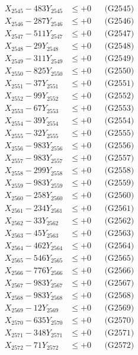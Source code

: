 \documentclass[a4paper,10pt]{article}
\begin{document}
{\begin{align}
X_{2545} - 483Y_{2545} &\leq +0 && \text{(G2545)} \\
X_{2546} - 287Y_{2546} &\leq +0 && \text{(G2546)} \\
X_{2547} - 511Y_{2547} &\leq +0 && \text{(G2547)} \\
X_{2548} - 29Y_{2548} &\leq +0 && \text{(G2548)} \\
X_{2549} - 311Y_{2549} &\leq +0 && \text{(G2549)} \\
X_{2550} - 825Y_{2550} &\leq +0 && \text{(G2550)} \\
\allowbreak
X_{2551} - 37Y_{2551} &\leq +0 && \text{(G2551)} \\
X_{2552} - 99Y_{2552} &\leq +0 && \text{(G2552)} \\
X_{2553} - 67Y_{2553} &\leq +0 && \text{(G2553)} \\
X_{2554} - 39Y_{2554} &\leq +0 && \text{(G2554)} \\
X_{2555} - 32Y_{2555} &\leq +0 && \text{(G2555)} \\
X_{2556} - 983Y_{2556} &\leq +0 && \text{(G2556)} \\
X_{2557} - 983Y_{2557} &\leq +0 && \text{(G2557)} \\
X_{2558} - 299Y_{2558} &\leq +0 && \text{(G2558)} \\
X_{2559} - 983Y_{2559} &\leq +0 && \text{(G2559)} \\
X_{2560} - 258Y_{2560} &\leq +0 && \text{(G2560)} \\
\allowbreak
X_{2561} - 234Y_{2561} &\leq +0 && \text{(G2561)} \\
X_{2562} - 33Y_{2562} &\leq +0 && \text{(G2562)} \\
X_{2563} - 45Y_{2563} &\leq +0 && \text{(G2563)} \\
X_{2564} - 462Y_{2564} &\leq +0 && \text{(G2564)} \\
X_{2565} - 546Y_{2565} &\leq +0 && \text{(G2565)} \\
X_{2566} - 776Y_{2566} &\leq +0 && \text{(G2566)} \\
X_{2567} - 983Y_{2567} &\leq +0 && \text{(G2567)} \\
X_{2568} - 983Y_{2568} &\leq +0 && \text{(G2568)} \\
X_{2569} - 12Y_{2569} &\leq +0 && \text{(G2569)} \\
X_{2570} - 635Y_{2570} &\leq +0 && \text{(G2570)} \\
\allowbreak
X_{2571} - 348Y_{2571} &\leq +0 && \text{(G2571)} \\
X_{2572} - 71Y_{2572} &\leq +0 && \text{(G2572)} \\

\end{align}}
\end{document}
